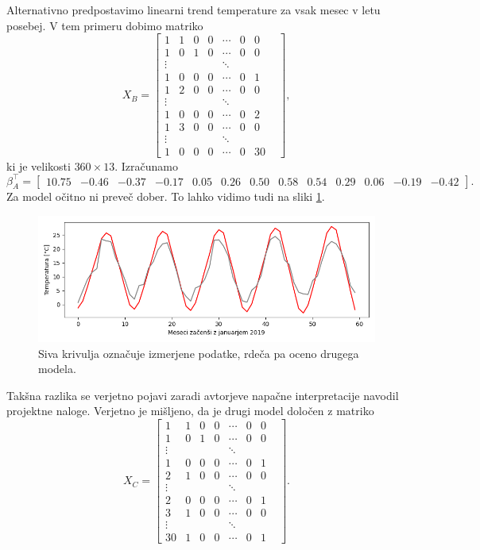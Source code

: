 \documentclass[12pt, a4paper]{article}
\begin{document}
Alternativno predpostavimo linearni trend temperature za 
vsak mesec v letu posebej. V tem primeru dobimo matriko
\[
    X_B = \begin{bmatrix}
        1 & 1 & 0 & 0 & \cdots & 0 & 0 \\
        1 & 0 & 1 & 0 & \cdots & 0 & 0 \\
        \vdots & & & & \ddots & & & \\
        1 & 0 & 0 & 0 & \cdots & 0 & 1 \\
        1 & 2 & 0 & 0 & \cdots & 0 & 0 \\
        \vdots & & & & \ddots & & & \\
        1 & 0 & 0 & 0 & \cdots & 0 & 2 \\
        1 & 3 & 0 & 0 & \cdots & 0 & 0 \\
        \vdots & & & & \ddots & & & \\
        1 & 0 & 0 & 0 & \cdots & 0 & 30 
    \end{bmatrix},
\]
ki je velikosti $360 \times 13$. Izračunamo
\setcounter{MaxMatrixCols}{20}
\footnotesize
\[
    \beta_A^\top = \begin{bmatrix}
        10.75 & -0.46 & -0.37 & -0.17 & 0.05 & 0.26 & 
        0.50 & 0.58 & 0.54 & 0.29 & 0.06 & -0.19 & -0.42
    \end{bmatrix}.
\]
\normalsize
Za model očitno ni preveč dober. To lahko vidimo tudi na sliki 
\ref{png:drugi}.
\begin{figure}[H]
    \centering
    \includegraphics[width=14cm]{Slike/drugi_model.png}
    \caption{Siva krivulja označuje izmerjene podatke, rdeča pa oceno 
    drugega modela.}
    \label{png:drugi}
\end{figure}
Takšna razlika se verjetno pojavi zaradi avtorjeve napačne interpretacije navodil 
projektne naloge. Verjetno je mišljeno, da je drugi model določen z matriko
\[
    X_C = \begin{bmatrix}
        1 & 1 & 0 & 0 & \cdots & 0 & 0 \\
        1 & 0 & 1 & 0 & \cdots & 0 & 0 \\
        \vdots & & & & \ddots & & & \\
        1 & 0 & 0 & 0 & \cdots & 0 & 1 \\
        2 & 1 & 0 & 0 & \cdots & 0 & 0 \\
        \vdots & & & & \ddots & & & \\
        2 & 0 & 0 & 0 & \cdots & 0 & 1 \\
        3 & 1 & 0 & 0 & \cdots & 0 & 0 \\
        \vdots & & & & \ddots & & & \\
        30 & 1 & 0 & 0 & \cdots & 0 & 1 
    \end{bmatrix}.
\]
\end{document}
